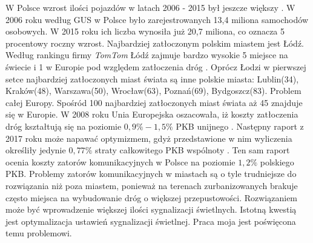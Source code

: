 \documentclass[12pt]{book}
\theoremstyle{plain}
\begin{document}
W Polsce wzrost ilości pojazdów w latach 2006 - 2015 był jeszcze większy \cite{liczbaPojazdowPolska}. W 2006 roku według GUS w Polsce było zarejestrowanych 13,4 miliona samochodów osobowych. W 2015 roku ich liczba wynosiła już 20,7 miliona, co oznacza 5 procentowy roczny wzrost.
Najbardziej zatłoczonym polskim miastem jest Łódź. Według rankingu firmy \textit{TomTom } Łódź zajmuje bardzo wysokie 5 miejsce na świecie i 1 w Europie pod względem zatłoczenia dróg \cite{rankingTomTom}. Oprócz Łodzi w pierwszej setce najbardziej zatłoczonych miast świata są inne polskie miasta: Lublin(34), Kraków(48), Warszawa(50), Wrocław(63), Poznań(69), Bydgoszcz(83). Problem całej Europy. Spośród 100 najbardziej zatłoczonych miast świata aż 45 znajduje się w Europie. W 2008 roku Unia Europejska oszacowała, iż koszty zatłoczenia dróg kształtują się na poziomie $0,9\%-1,5\%$ PKB unijnego \cite{ue2008}. Następny raport z 2017 roku może napawać optymizmem, gdyż przedstawione w nim wyliczenia określiły jedynie $0,77\%$ straty całkowitego PKB wspólnoty \cite{ue2017}. Ten sam raport ocenia koszty zatorów komunikacyjnych w Polsce na poziomie $1,2\%$ polskiego PKB.
Problemy zatorów komunikacyjnych w miastach są o tyle trudniejsze do rozwiązania niż poza miastem, ponieważ na terenach zurbanizowanych brakuje często miejsca na wybudowanie dróg o większej przepustowości. Rozwiązaniem może być wprowadzenie większej ilości sygnalizacji świetlnych. Istotną kwestią jest optymalizacja ustawień sygnalizacji świetlnej. Praca moja jest poświęcona temu problemowi. 
%
\end{document}
